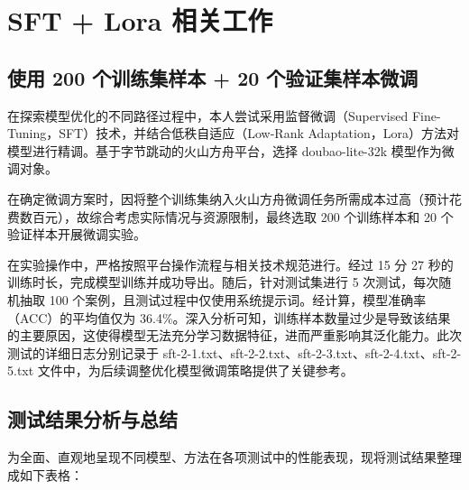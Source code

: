 \section{SFT + Lora 相关工作}
\subsection{使用 200 个训练集样本 + 20 个验证集样本微调}
在探索模型优化的不同路径过程中，本人尝试采用监督微调（Supervised Fine-Tuning，SFT）技术，并结合低秩自适应（Low-Rank Adaptation，Lora）方法对模型进行精调。基于字节跳动的火山方舟平台，选择 doubao-lite-32k 模型作为微调对象。

在确定微调方案时，因将整个训练集纳入火山方舟微调任务所需成本过高（预计花费数百元），故综合考虑实际情况与资源限制，最终选取 200 个训练样本和 20 个验证样本开展微调实验。

在实验操作中，严格按照平台操作流程与相关技术规范进行。经过 15 分 27 秒的训练时长，完成模型训练并成功导出。随后，针对测试集进行 5 次测试，每次随机抽取 100 个案例，且测试过程中仅使用系统提示词。经计算，模型准确率（ACC）的平均值仅为 36.4\%。深入分析可知，训练样本数量过少是导致该结果的主要原因，这使得模型无法充分学习数据特征，进而严重影响其泛化能力。此次测试的详细日志分别记录于 sft-2-1.txt、sft-2-2.txt、sft-2-3.txt、sft-2-4.txt、sft-2-5.txt 文件中，为后续调整优化模型微调策略提供了关键参考。

\subsection{测试结果分析与总结}
为全面、直观地呈现不同模型、方法在各项测试中的性能表现，现将测试结果整理成如下表格：


